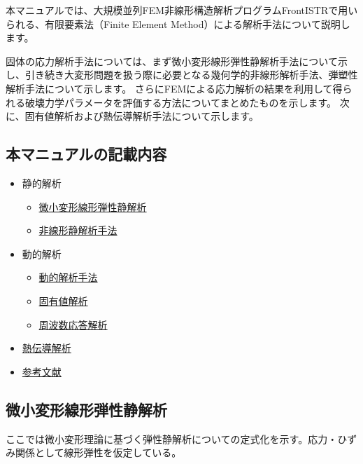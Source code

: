 \documentclass[a4paper,pandoc,ja=standard]{bxjsarticle}
\providecommand{\tightlist}{%
  \setlength{\itemsep}{0pt}\setlength{\parskip}{0pt}}
\begin{document}
本マニュアルでは、大規模並列FEM非線形構造解析プログラムFrontISTRで用いられる、有限要素法（Finite Element Method）による解析手法について説明します。

固体の応力解析手法については、まず微小変形線形弾性静解析手法について示し、引き続き大変形問題を扱う際に必要となる幾何学的非線形解析手法、弾塑性解析手法について示します。
さらにFEMによる応力解析の結果を利用して得られる破壊力学パラメータを評価する方法についてまとめたものを示します。
次に、固有値解析および熱伝導解析手法について示します。

\hypertarget{ux672cux30deux30cbux30e5ux30a2ux30ebux306eux8a18ux8f09ux5185ux5bb9}{%
\subsection{本マニュアルの記載内容}\label{ux672cux30deux30cbux30e5ux30a2ux30ebux306eux8a18ux8f09ux5185ux5bb9}}

\begin{itemize}
\tightlist
\item
  静的解析

  \begin{itemize}
  \tightlist
  \item
    \href{theory_01.md}{微小変形線形弾性静解析}
  \item
    \href{theory_02.md}{非線形静解析手法}
  \end{itemize}
\item
  動的解析

  \begin{itemize}
  \tightlist
  \item
    \href{theory_03.md}{動的解析手法}
  \item
    \href{theory_05.md}{固有値解析}
  \item
    \href{theory_06.md}{周波数応答解析}
  \end{itemize}
\item
  \href{theory_04.md}{熱伝導解析}
\item
  \href{theory_07.md}{参考文献}
\end{itemize}

\hypertarget{ux5faeux5c0fux5909ux5f62ux7ddaux5f62ux5f3eux6027ux9759ux89e3ux6790}{%
\subsection{微小変形線形弾性静解析}\label{ux5faeux5c0fux5909ux5f62ux7ddaux5f62ux5f3eux6027ux9759ux89e3ux6790}}

ここでは微小変形理論に基づく弾性静解析についての定式化を示す。応力・ひずみ関係として線形弾性を仮定している。
\end{document}
